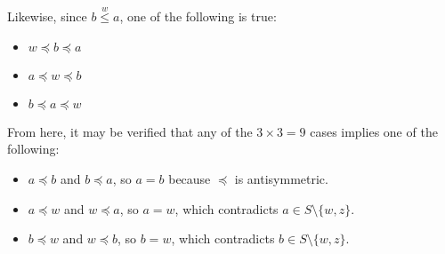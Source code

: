 \documentclass{article}
\newcommand{\po}[1]{\overset{#1}{\leq}}
\begin{document}
\begin{enumerate}[label=(\roman*)]
\begin{itemize}
    Likewise, since $b \po{w} a$,
    one of the following is true:
    \begin{itemize}
    \item $w \preceq b \preceq a$
    \item $a \preceq w \preceq b$
    \item $b \preceq a \preceq w$
    \end{itemize}
    From here, it may be verified
    that any of the $3 \times 3 = 9$ cases
    implies one of the following:
    \begin{itemize}
    \item
      $a \preceq b$ and $b \preceq a$,
      so $a = b$ because $\preceq$ is antisymmetric.
    \item
      $a \preceq w$ and $w \preceq a$,
      so $a = w$, which contradicts $a \in S \setminus \{w, z\}$.
    \item
      $b \preceq w$ and $w \preceq b$,
      so $b = w$, which contradicts $b \in S \setminus \{w, z\}$.
    \end{itemize}
  \end{itemize}


\end{enumerate}
\end{document}

